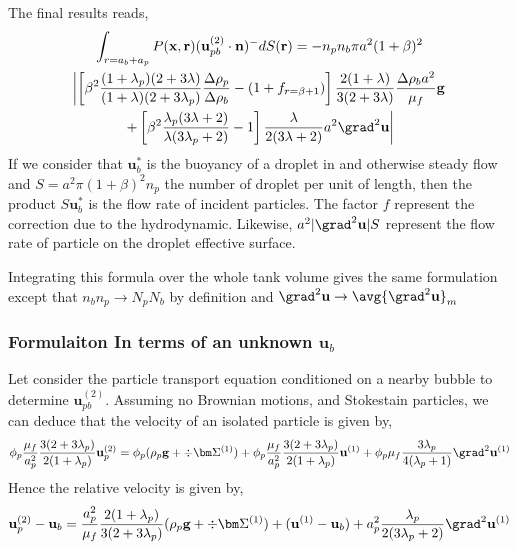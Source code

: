 The final results reads, 
\begin{multline*} 
    \int_{r=a_b+a_p } 
    P(\textbf{x},\textbf{r}) (\textbf{u}_{pb}^{(2)}\cdot \textbf{n})^- dS(\textbf{r})
    =
    - n_pn_b \pi a^2(1+\beta)^2 \\\left|
        \left[\beta^2\frac{(1+\lambda_p)(2+3\lambda)}{(1+\lambda)(2+3\lambda_p)}\frac{\Delta\rho_p}{\Delta\rho_b}  - (1 + f_{r=\beta+1})  \right]  \frac{2(1+\lambda)}{3(2+3\lambda)} \frac{\Delta\rho_b a^2}{\mu_f}\textbf{g} \right.\\\left.
        + \left[\beta^2\frac{\lambda_p(3\lambda+2)}{\lambda(3\lambda_p +2)} - 1 \right] \frac{\lambda}{2(3\lambda +2)}a^2 \grad^2 \textbf{u}
    \right|
\end{multline*} 
If we consider that $\textbf{u}_b^*$ is the buoyancy of a droplet in and otherwise steady flow and $S = a^2 \pi (1+\beta)^2 n_p $ the number of droplet per unit of  length, then the product $S \textbf{u}_b^*$ is the flow rate of incident particles. 
The factor $f$ represent the correction due to the hydrodynamic. 
Likewise, $a^2 |\grad^2 \textbf{u}| S$ represent the flow rate of particle on the droplet effective surface. 



Integrating this formula over the whole tank volume gives the same formulation except that $n_bn_p \to N_p N_b$ by definition and $\grad^2 \textbf{u} \to \avg{\grad^2 \textbf{u}}_m$ 



\subsubsection{Formulaiton In terms of an unknown $\textbf{u}_b$}
Let consider the particle transport equation conditioned on a nearby bubble to determine $\textbf{u}_{pb}^{(2)}$. 
Assuming no Brownian motions, and Stokestain  particles, we can deduce that the velocity of an isolated particle is given by, 
\begin{equation}
    \phi_p
    \frac{\mu_f}{a_p^2}
    \frac{3(2+3\lambda_p)}{2(1+\lambda_p)}\textbf{u}_p^{(2)}
    =
    \phi_p( \rho_p\textbf{g}+ \div\bm\Sigma^{(1)} )
    +
    \phi_p\frac{\mu_f}{a_p^2}
    \frac{3(2+3\lambda_p)}{2(1+\lambda_p)}\textbf{u}^{(1)} 
    + \phi_p\mu_f  \frac{3\lambda_p}{4(\lambda_p +1)} \grad^2 \textbf{u}^{(1)}
\end{equation}
Hence the relative velocity is given by, 
\begin{equation}
    \textbf{u}_p^{(2)} - \textbf{u}_b
    =
    \frac{a_p^2}{\mu_f}
    \frac{2(1+\lambda_p)}{3(2+3\lambda_p)}( \rho_p\textbf{g}+ \div\bm\Sigma^{(1)} )
    + (\textbf{u}^{(1)} - \textbf{u}_b)
    + a_p^2 \frac{\lambda_p}{2(3\lambda_p +2)} \grad^2 \textbf{u}^{(1)}
\end{equation}

